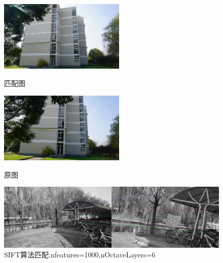 \documentclass{article}
\begin{document}
        \begin{figure}[htbp]
                \begin{minipage}[t]{0.5\linewidth}\centering
                \includegraphics[width=6cm]{Pic2-1.png}
                \caption{匹配图}\label{3-a}
                \end{minipage}
                \begin{minipage}[t]{0.5\linewidth}\centering
                \includegraphics[width=6cm]{Pic2-2.png}
                \caption{原图}\label{3-b}
                \end{minipage}
                \begin{minipage}[t]{1\linewidth}\centering
                \includegraphics[width=12cm]{sift_matches_Pic2.jpg}
                \caption{SIFT算法匹配:nfeatures=1000,nOctaveLayers=6}\label{3-c}
                \end{minipage}
        \end{figure}
\end{document}
